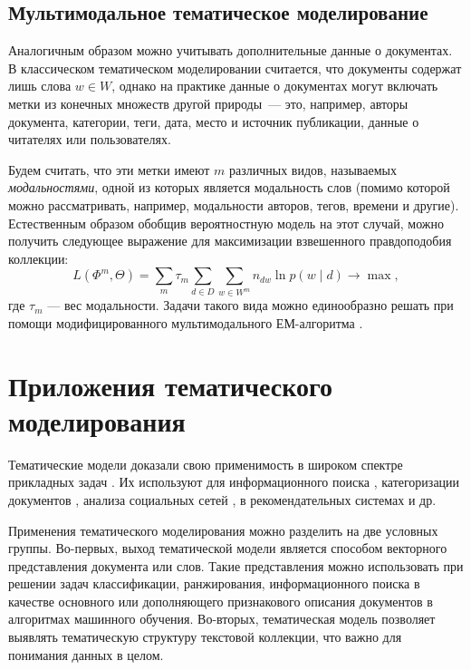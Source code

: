\subsection{Мультимодальное тематическое моделирование}

Аналогичным образом можно учитывать дополнительные данные о документах.
В классическом тематическом моделировании считается, что документы содержат лишь слова $w \in W$, однако на практике данные о документах могут включать метки из конечных множеств другой природы~--- это, например, авторы документа, категории, теги, дата, место и источник публикации, данные о читателях или пользователях.

Будем считать, что эти метки имеют $m$ различных видов, называемых  \textit{модальностями}, одной из которых является модальность слов (помимо которой можно рассматривать, например, модальности авторов, тегов, времени и другие). Естественным образом обобщив вероятностную модель на этот случай, можно получить следующее выражение для максимизации взвешенного правдоподобия коллекции:
\[
    L(\Phi^m, \Theta) = \sum_m \tau_m \sum_{d\in D} \sum_{w \in W^m} n_{dw} \ln p(w \mid d) \rightarrow \max,
\]
где $\tau_m$ --- вес модальности.
Задачи такого вида можно единообразно решать при помощи модифицированного мультимодального ЕМ-алгоритма \cite{voron15nonbayesian}.

\section{Приложения тематического моделирования}


Тематические модели доказали свою применимость в широком спектре прикладных задач \cite{fntir2017applications}. Их используют для информационного поиска \cite{yi2009, wang2011}, категоризации документов \cite{rubin2012}, анализа социальных сетей \cite{varshney2014, pinto2016}, в рекомендательных системах \cite{wang2011,lee2015} и др.

Применения тематического моделирования можно разделить на две условных группы. Во-первых, выход тематической модели является способом векторного представления документа или слов. Такие представления можно использовать при решении задач классификации, ранжирования, информационного поиска в качестве основного или дополняющего признакового описания документов в алгоритмах машинного обучения. Во-вторых, тематическая модель позволяет выявлять тематическую структуру текстовой коллекции, что важно для понимания данных в целом.

